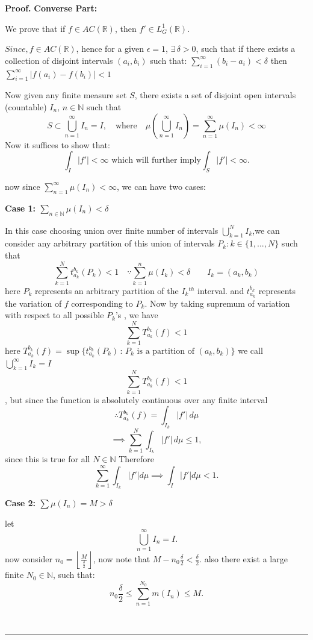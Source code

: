 \documentclass[10pt,a4paper]{amsart}
\newenvironment{proof}[1][Proof]{\noindent\textbf{#1.} }{\
\rule{0.5em}{0.5em}}
\begin{document}
\begin{proof}
\textbf{Converse Part:}

We prove that if $f \in AC(\mathbb{R})$, then $f' \in L^1_G(\mathbb{R})$.  

$Since, f \in AC(\mathbb{R})$, hence for a given $\epsilon = 1$, $\exists \, \delta > 0$, such that if there exists a collection of disjoint intervals $(a_i, b_i)$ such that:
$\sum_{i=1}^\infty (b_i - a_i) < \delta$
then$\sum_{i=1}^\infty \left| f(a_i)-f(b_i)\right| < 1$

Now given any finite measure set $S$, there exists a set of disjoint open intervals (countable) $I_n, \, n \in \mathbb{N}$ such that
\[
S \subset \bigcup_{n=1}^\infty I_n=I, \quad \text{where} \quad \mu\left(\bigcup_{n=1}^\infty I_n\right) = \sum_{n=1}^\infty \mu(I_n) < \infty
\]
Now it suffices to show that:
\[
\int_I |f'| < \infty \text{  which will further imply}  \int_S|f'| < \infty.
\]

now since $\sum_{n=1}^\infty \mu(I_n) < \infty$,
we can have two cases:

\textbf{Case 1: $\sum_{n \in \mathbb{N}} \mu(I_n) < \delta$}

In this case choosing union over finite number of intervals $\bigcup_{k=1}^N I_k$,we can consider any arbitrary partition of this union of intervals ${P_k:k\in\{1,...,N\}}$ such that 
\[
\sum_{k=1}^N t_{a_k}^{b_k}(P_k)<1 \quad \because \sum_{k=1}^n \mu(I_k) < \delta \quad\quad I_k = (a_k,b_k)
\]
here $P_k$ represents an arbitrary partition of the $I_k$$^{th}$ interval. and $t_{a_k}^{b_k}$ represents the variation of $f$ corresponding to $P_k$. Now by taking supremum of variation with respect to all possible $P_k$'s , we have
\[
\sum_{k=1}^N T_{a_k}^{b_k}(f)<1 
\]
here $T_{a_k}^{b_k}(f) = \sup\{t_{a_k}^{b_k}(P_k) \,:\, P_k\text{ is a partition of }(a_k,b_k) \}$ 
we call $\bigcup_{k=1}^\infty I_k = I$
\[
\sum_{k=1}^N T_{a_k}^{b_k}(f)<1 \]
 , but since the function is absolutely continuous over any finite interval
\[
\therefore T_{a_k}^{b_k}(f) =  \int_{I_k} \left|f'\right| \, d\mu 
\]
\[
\implies \sum_{k=1}^N  \int_{I_k} \left|f'\right|  \, d\mu \leq 1,
\]
since this is true for all $N \in \mathbb{N}$
Therefore
\[
\sum_{k=1}^\infty \int_{I_k} |f'|d\mu \implies\int_{I} |f'| d\mu < 1.
\]

\textbf{Case 2: $\sum \mu(I_n) = M > \delta$}

let\[
\bigcup_{n=1}^\infty I_n = I.
\]
now consider $n_0 = \left\lfloor \frac{M}{\frac{\delta}{2}} \right\rfloor$, now note that $M - n_0 \frac{\delta}{2} < \frac{\delta}{2}$.  
also there exist a large finite $N_0 \in \mathbb{N}$, such that:
\[
n_0\frac{\delta}{2} \leq\sum_{n=1}^{N_0} m(I_n) \leq M .
\]


\end{proof}
\end{document}
